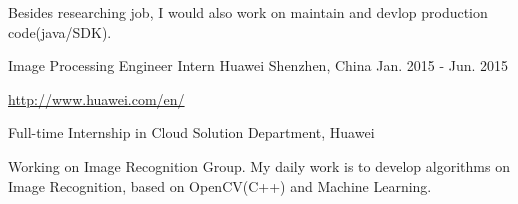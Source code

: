 \begin{cventries}
{\begin{cvitems}
	\item {Besides researching job, I would also work on maintain and devlop production code(java/SDK).}
      \end{cvitems}
    }
  \cventry
    {Image Processing Engineer Intern}
    {Huawei}
    {Shenzhen, China}
    {Jan. 2015 - Jun. 2015}
    {
	\begin{cvitems}
	  \item {\url{http://www.huawei.com/en/}}
	  \item {Full-time Internship in Cloud Solution Department, Huawei}
	  \item {Working on Image Recognition Group. My daily work is to develop algorithms on Image Recognition, based on OpenCV(C++) and Machine Learning.}
	\end{cvitems}
    }
\end{cventries}
